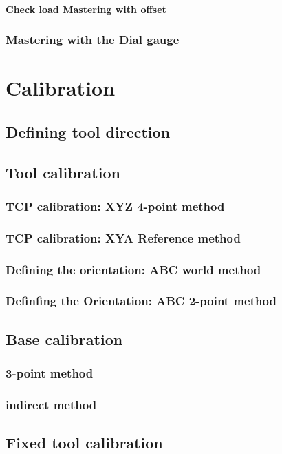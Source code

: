 \documentclass{book}
\begin{document}
				\paragraph{Check load Mastering with offset}
			\subsubsection{Mastering with the Dial gauge}
	
		\section{Calibration}
			\subsection{Defining tool direction}
			\subsection{Tool calibration}
			
				\subsubsection{TCP calibration: XYZ 4-point method}
				\subsubsection{TCP calibration: XYA Reference method}
				\subsubsection{Defining the orientation: ABC world method}
				\subsubsection{Definfing the Orientation: ABC 2-point method}
				
			\subsection{Base calibration}
				\subsubsection{3-point method}
				\subsubsection{indirect method}
			\subsection{Fixed tool calibration}
\end{document}
